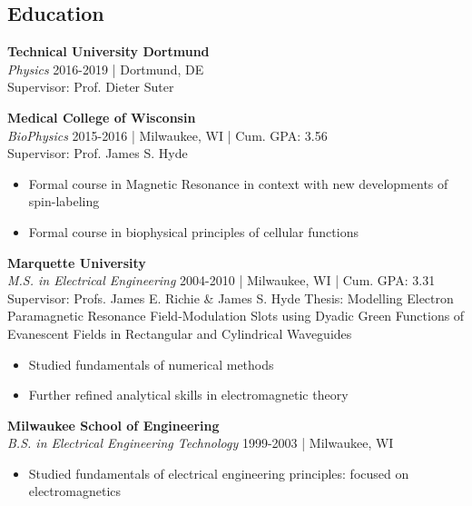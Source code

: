 \subsection*{Education} 
\vspace{-0.5em}
\noindent\textbf{Technical University Dortmund} \\
\textit{Physics} 2016-2019 | Dortmund, DE \\
Supervisor: Prof. Dieter Suter 
\newline

\noindent\textbf{Medical College of Wisconsin} \\
\textit{BioPhysics} 2015-2016 | Milwaukee, WI | Cum. GPA: 3.56 \\
Supervisor: Prof. James S. Hyde
\vspace{-0.5em}
\begin{itemize}
\setlength\itemsep{-0.5em}
    \item Formal course in Magnetic Resonance in context with new developments of spin-labeling
    \item Formal course in biophysical principles of cellular functions 
\end{itemize}

\noindent\textbf{Marquette University} \\
\textit{M.S. in Electrical Engineering} 2004-2010 | Milwaukee, WI | Cum. GPA: 3.31 \\
Supervisor: Profs. James E. Richie \& James S. Hyde
Thesis: Modelling Electron Paramagnetic Resonance Field-Modulation Slots using Dyadic Green Functions of Evanescent Fields in Rectangular and Cylindrical Waveguides
\vspace{-0.5em}
\begin{itemize}
\setlength\itemsep{-0.5em}
    \item Studied fundamentals of numerical methods
    \item Further refined analytical skills in electromagnetic theory 
\end{itemize}

\noindent\textbf{Milwaukee School of Engineering}\\
\textit{B.S. in Electrical Engineering Technology}
1999-2003 | Milwaukee, WI
\vspace{-0.5em}
\begin{itemize}
\setlength\itemsep{-0.5em}
    \item Studied fundamentals of electrical engineering principles: focused on electromagnetics
\end{itemize}


